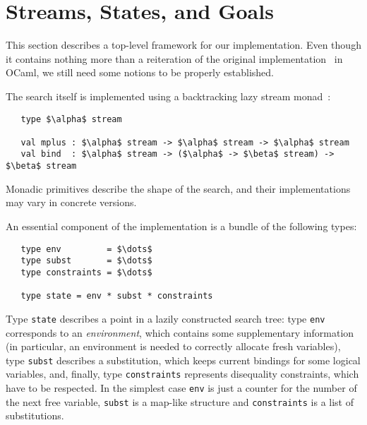 \section{Streams, States, and Goals}
\label{sec:goals}

This section describes a top-level framework for our implementation. Even though it contains
nothing more than a reiteration of the original implementation~\cite{MicroKanren, CKanren}
in OCaml, we still need some notions to be properly established.

The search itself is implemented using a backtracking lazy stream monad~\cite{KiselyovBacktracking}:

\begin{lstlisting}
   type $\alpha$ stream

   val mplus : $\alpha$ stream -> $\alpha$ stream -> $\alpha$ stream
   val bind  : $\alpha$ stream -> ($\alpha$ -> $\beta$ stream) -> $\beta$ stream
\end{lstlisting}

Monadic primitives describe the shape of the search, and their implementations may
vary in concrete \miniKanren versions.

An essential component of the implementation is a bundle of the following types:

\begin{lstlisting}
   type env         = $\dots$
   type subst       = $\dots$
   type constraints = $\dots$

   type state = env * subst * constraints
\end{lstlisting}

Type \lstinline{state} describes a point in a lazily constructed search tree: type \lstinline{env} corresponds
to an \emph{environment}, which contains some supplementary information (in particular, an environment is needed to
correctly allocate fresh variables), type \lstinline{subst} describes a substitution, which keeps current bindings
for some logical variables, and, finally, type \lstinline{constraints} represents disequality constraints,
which have to be respected. In the simplest case \lstinline{env} is just a counter for the number of the next free
variable, \lstinline{subst} is a map-like structure and \lstinline{constraints} is a list of substitutions.


